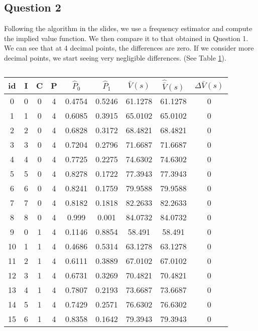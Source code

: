 \documentclass[12pt,english]{article}
\begin{document}
\subsection*{Question 2}
Following the algorithm in the slides, we use a frequency estimator and compute the implied value function. We then compare it to that obtained in Question 1. We can see that at 4 decimal points, the differences are zero. If we consider more decimal points, we start seeing very negligible differences. (See Table \ref{Table2}).

\begin{table}[]
\caption{}
\label{Table2}
\centering
\begin{tabular}{|c|c|c|c|c|c|c|c|c|}
\hline
id & I & C & P & $\hat{P}_{0}$  & $\hat{P}_{1}$  & $\bar{V}(s)$     & $\hat{\bar{V}}(s)$    & $\Delta\bar{V}(s)$ \\
\hline
0  & 0 & 0 & 4 & 0.4754 & 0.5246 & 61.1278 & 61.1278 & 0        \\
1  & 1 & 0 & 4 & 0.6085 & 0.3915 & 65.0102 & 65.0102 & 0        \\
2  & 2 & 0 & 4 & 0.6828 & 0.3172 & 68.4821 & 68.4821 & 0        \\
3  & 3 & 0 & 4 & 0.7204 & 0.2796 & 71.6687 & 71.6687 & 0        \\
4  & 4 & 0 & 4 & 0.7725 & 0.2275 & 74.6302 & 74.6302 & 0        \\
5  & 5 & 0 & 4 & 0.8278 & 0.1722 & 77.3943 & 77.3943 & 0        \\
6  & 6 & 0 & 4 & 0.8241 & 0.1759 & 79.9588 & 79.9588 & 0        \\
7  & 7 & 0 & 4 & 0.8182 & 0.1818 & 82.2633 & 82.2633 & 0        \\
8  & 8 & 0 & 4 & 0.999  & 0.001  & 84.0732 & 84.0732 & 0        \\
9  & 0 & 1 & 4 & 0.1146 & 0.8854 & 58.491  & 58.491  & 0        \\
10 & 1 & 1 & 4 & 0.4686 & 0.5314 & 63.1278 & 63.1278 & 0        \\
11 & 2 & 1 & 4 & 0.6111 & 0.3889 & 67.0102 & 67.0102 & 0        \\
12 & 3 & 1 & 4 & 0.6731 & 0.3269 & 70.4821 & 70.4821 & 0        \\
13 & 4 & 1 & 4 & 0.7807 & 0.2193 & 73.6687 & 73.6687 & 0        \\
14 & 5 & 1 & 4 & 0.7429 & 0.2571 & 76.6302 & 76.6302 & 0        \\
15 & 6 & 1 & 4 & 0.8358 & 0.1642 & 79.3943 & 79.3943 & 0        \\

\end{tabular}
\end{table}
\end{document}
